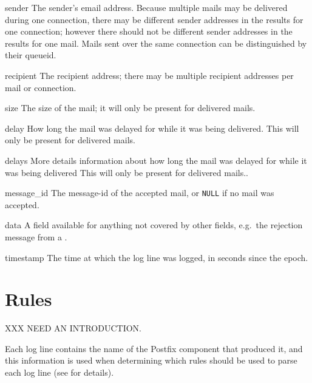 \begin{eqlist}
    \item [sender] The sender's email address.  Because multiple mails may
        be delivered during one connection, there may be different sender
        addresses in the results for one connection; however there should
        not be different sender addresses in the results for one mail.
        Mails sent over the same connection can be distinguished by their
        queueid.

    \item [recipient] The recipient address; there may be multiple
        recipient addresses per mail or connection.

    \item [size] The size of the mail; it will only be present for
        delivered mails.

    \item [delay] How long the mail was delayed for while it was being
        delivered.  This will only be present for delivered mails.

    \item [delays] More details information about how long the mail was
        delayed for while it was being delivered  This will only be present
        for delivered mails..

    \item [message\_id] The message-id of the accepted mail, or
        \texttt{NULL} if no mail was accepted.

    \item [data] A field available for anything not covered by other
        fields, e.g.\ the rejection message from a \@.

    \item [timestamp] The time at which the log line was logged, in seconds
        since the epoch.

\end{eqlist}



\section{Rules}

\label{rules in implementation}

XXX NEED AN INTRODUCTION\@.

Each log line contains the name of the Postfix component that produced it,
and this information is used when determining which rules should be used to
parse each log line (see  for details).

